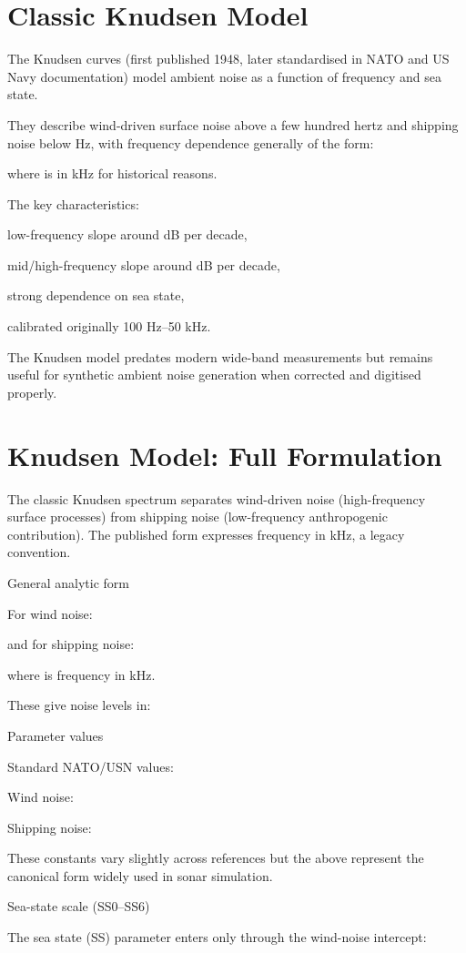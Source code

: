 \documentclass[12pt]{article}
\begin{document}
\section*{Classic Knudsen Model}
The Knudsen curves (first published 1948, later standardised in NATO and US Navy documentation) model ambient noise as a function of frequency and sea state.

They describe wind-driven surface noise above a few hundred hertz and shipping noise below  Hz, with frequency dependence generally of the form:


where  is in kHz for historical reasons.

The key characteristics:

low-frequency slope around  dB per decade,

mid/high-frequency slope around  dB per decade,

strong dependence on sea state,

calibrated originally 100 Hz–50 kHz.

The Knudsen model predates modern wide-band measurements but remains useful for synthetic ambient noise generation when corrected and digitised properly.

\section*{Knudsen Model: Full Formulation}
The classic Knudsen spectrum separates wind-driven noise (high-frequency surface processes) from shipping noise (low-frequency anthropogenic contribution). The published form expresses frequency in kHz, a legacy convention.

General analytic form

For wind noise:


and for shipping noise:


where  is frequency in kHz.

These give noise levels in:


Parameter values

Standard NATO/USN values:

Wind noise:



Shipping noise:



These constants vary slightly across references but the above represent the canonical form widely used in sonar simulation.

Sea-state scale (SS0–SS6)

The sea state (SS) parameter enters only through the wind-noise intercept:
\end{document}
